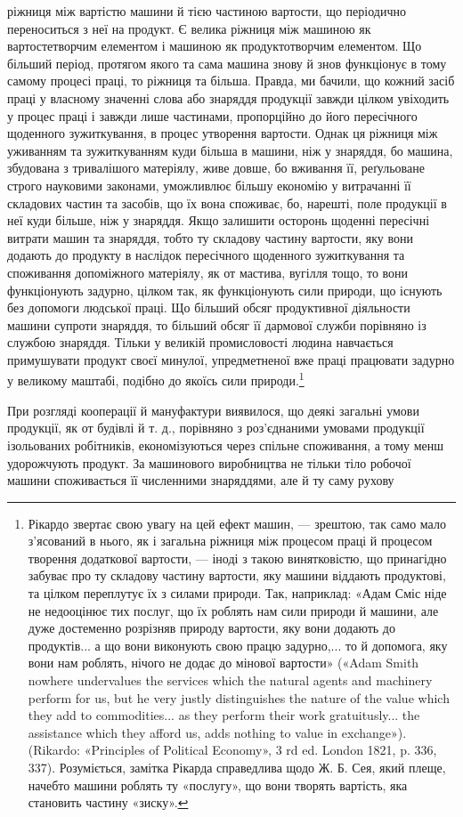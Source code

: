 ріжниця між вартістю машини й тією частиною вартости, що
періодично переноситься з неї на продукт. Є велика ріжниця між
машиною як вартостетворчим елементом і машиною як продуктотворчим
елементом. Що більший період, протягом якого та сама
машина знову й знов функціонує в тому самому процесі праці,
то ріжниця та більша. Правда, ми бачили, що кожний засіб праці
у власному значенні слова або знаряддя продукції завжди цілком
увіходить у процес праці і завжди лише частинами, пропорційно
до його пересічного щоденного зужиткування, в процес утворення
вартости. Однак ця ріжниця між уживанням та зужиткуванням
куди більша в машини, ніж у знаряддя, бо машина, збудована
з тривалішого матеріялу, живе довше, бо вживання її, реґульоване
строго науковими законами, уможливлює більшу економію
у витрачанні її складових частин та засобів, що їх вона споживає,
бо, нарешті, поле продукції в неї куди більше, ніж у знаряддя.
Якщо залишити осторонь щоденні пересічні витрати машин та
знаряддя, тобто ту складову частину вартости, яку вони додають
до продукту в наслідок пересічного щоденного зужиткування
та споживання допоміжного матеріялу, як от мастива, вугілля
тощо, то вони функціонують задурно, цілком так, як функціонують
сили природи, що існують без допомоги людської праці.
Що більший обсяг продуктивної діяльности машини супроти
знаряддя, то більший обсяг її дармової служби порівняно із
службою знаряддя. Тільки у великій промисловості людина
навчається примушувати продукт своєї минулої, упредметненої
вже праці працювати задурно у великому маштабі, подібно до
якоїсь сили природи.\footnote{
Рікардо звертає свою увагу на цей ефект машин, — зрештою,
так само мало з’ясований в нього, як і загальна ріжниця між процесом
праці й процесом творення додаткової вартости, — іноді з такою винятковістю,
що принагідно забуває про ту складову частину вартости, яку
машини віддають продуктові, та цілком переплутує їх з силами природи.
Так, наприклад: «Адам Сміс ніде не недооцінює тих послуг, що їх роблять
нам сили природи й машини, але дуже достеменно розрізняв природу
вартости, яку вони додають до продуктів... а що вони виконують свою
працю задурно,... то й допомога, яку вони нам роблять, нічого не додає
до мінової вартости» («Adam Smith nowhere undervalues the services
which the natural agents and machinery perform for us, but he very justly
distinguishes the nature of the value which they add to commodities... as
they perform their work gratuitusly... the assistance which they afford
us, adds nothing to value in exchange»). (Rikardo: «Principles of
Political Economy», 3 rd ed. London 1821, p. 336, 337). Розуміється,
замітка Рікарда справедлива щодо Ж. Б. Сея, який плеще, начебто машини
роблять ту «послугу», що вони творять вартість, яка становить
частину «зиску».
}

При розгляді кооперації й мануфактури виявилося, що деякі
загальні умови продукції, як от будівлі й т. д., порівняно з роз’єднаними
умовами продукції ізольованих робітників, економізуються
через спільне споживання, а тому менш удорожчують продукт.
За машинового виробництва не тільки тіло робочої машини
споживається її численними знаряддями, але й ту саму рухову